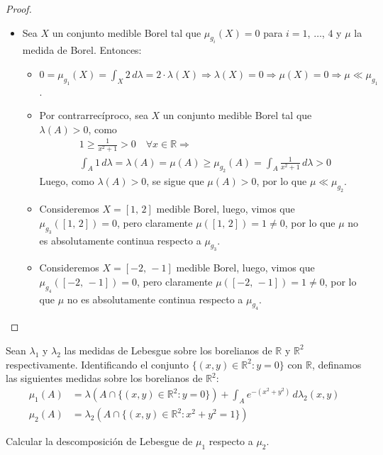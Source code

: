 \documentclass[12pt]{article}
\newenvironment{statement}[2][Ejercicio]{\begin{trivlist}
\item[\hskip \labelsep {\bfseries #1}\hskip \labelsep {\bfseries #2.}]}{\end{trivlist}}
\begin{document}
\begin{proof}
\begin{itemize}
\begin{itemize}
              \end{itemize}
        \item[(e)]  Sea \(X \) un conjunto medible Borel tal que \(\mu_{g_i}(X) = 0 \) para \(i = 1 \), \(\ldots \), \(4 \) y \(\mu \) la medida de Borel. Entonces: \begin{itemize}
                  \item[(i)] \(0 = \mu_{g_1}(X) = \int_X 2 \, d\lambda = 2 \cdot \lambda(X) \Rightarrow \lambda(X) = 0 \Rightarrow \mu(X) = 0 \Rightarrow \mu \ll \mu_{g_1} \).
                  \item[(ii)] Por contrarrecíproco, sea \(X \) un conjunto medible Borel tal que \(\lambda(A) > 0 \), como \begin{align*}
                             & 1 \geq \frac{1}{x^2 + 1} > 0 \quad \forall x \in \mathbb{R} \Rightarrow                                 \\
                             & \int_A 1 \, d\lambda = \lambda(A) = \mu(A) \geq \mu_{g_2}(A) = \int_A \frac{1}{x^2 + 1} \, d\lambda > 0
                        \end{align*}
                        Luego, como \(\lambda(A) > 0 \), se sigue que \(\mu(A) > 0 \), por lo que \(\mu \ll \mu_{g_2} \).
                  \item[(iii)] Consideremos \(X = [1\text{, }2] \) medible Borel, luego, vimos que \(\mu_{g_3}([1\text{, }2]) = 0 \), pero claramente \(\mu([1\text{, }2]) = 1 \neq 0 \), por lo que \(\mu \) no es absolutamente continua respecto a \(\mu_{g_3} \).
                  \item[(iv)] Consideremos \(X = [-2\text{, }-1] \) medible Borel, luego, vimos que \(\mu_{g_4}([-2\text{, }-1]) = 0 \), pero claramente \(\mu([-2\text{, }-1]) = 1 \neq 0 \), por lo que \(\mu \) no es absolutamente continua respecto a \(\mu_{g_4} \).
              \end{itemize}
    \end{itemize}
\end{proof}

\begin{statement}{11}
    Sean \(\lambda_1 \) y \(\lambda_2 \) las medidas de Lebesgue sobre los borelianos de \(\mathbb{R} \) y \(\mathbb{R}^2 \) respectivamente. Identificando el conjunto \(\{(x, y) \in \mathbb{R}^2 : y = 0\} \) con \(\mathbb{R} \), definamos las siguientes medidas sobre los borelianos de \(\mathbb{R}^2 \):
    \begin{align*}
        \mu_1(A) & = \lambda(A \cap \{(x, y) \in \mathbb{R}^2 : y = 0\}) + \int_A e^{-(x^2 + y^2)} \, d\lambda_2(x, y) \\
        \mu_2(A) & = \lambda_2(A \cap \{(x, y) \in \mathbb{R}^2 : x^2 + y^2 = 1\})
    \end{align*}

    Calcular la descomposición de Lebesgue de \(\mu_1 \) respecto a \(\mu_2 \).
\end{statement}
\end{document}
